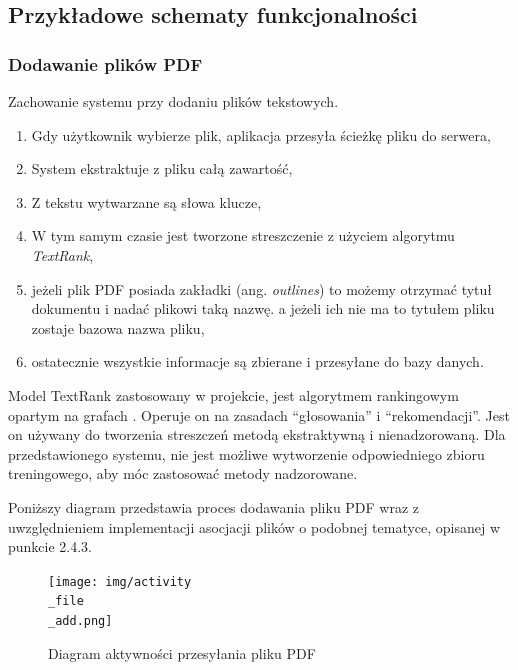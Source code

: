 \documentclass[12pt,a4paper,twoside]{article}
\begin{document}
\subsection{Przykładowe schematy funkcjonalności}
\subsubsection*{Dodawanie plików PDF}
Zachowanie systemu przy dodaniu plików tekstowych.
\begin{enumerate}
	\item Gdy użytkownik wybierze plik, aplikacja przesyła ścieżkę pliku do serwera,
	\item System ekstraktuje z pliku całą zawartość,
	\item Z tekstu wytwarzane są słowa klucze, 
	\item W tym samym czasie jest tworzone streszczenie z użyciem algorytmu \textit{TextRank},
	\item jeżeli plik PDF posiada zakładki (ang. \textit{outlines}) to możemy otrzymać tytuł dokumentu i nadać plikowi taką nazwę. a jeżeli ich nie ma to tytułem pliku zostaje bazowa nazwa pliku,
	\item ostatecznie wszystkie informacje są zbierane i przesyłane do bazy danych.
\end{enumerate}
Model TextRank zastosowany w projekcie, jest algorytmem rankingowym opartym na grafach \cite{textrank}. Operuje on na zasadach ``głosowania'' i ``rekomendacji''. Jest on używany do tworzenia streszczeń metodą ekstraktywną i nienadzorowaną. Dla przedstawionego systemu, nie jest możliwe wytworzenie odpowiedniego zbioru treningowego, aby móc zastosować metody nadzorowane. \par
Poniższy diagram przedstawia proces dodawania pliku PDF wraz z uwzględnieniem implementacji asocjacji plików o podobnej tematyce, opisanej w punkcie 2.4.3.
\begin{figure}[h!]
\centering
  \texttt{[image: img/activity\\\_file\\\_add.png]}
  \caption{Diagram aktywności przesyłania pliku PDF}
\end{figure}
\clearpage
\newpage
\end{document}
